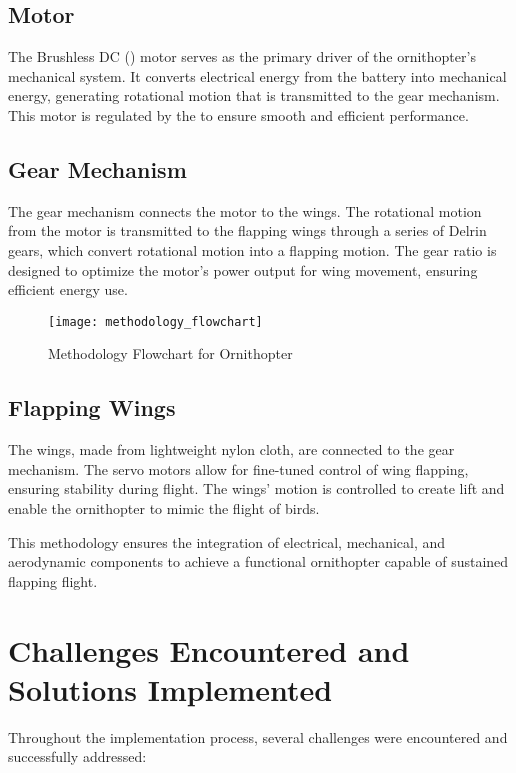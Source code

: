 \subsection{\bldc Motor}
The Brushless DC (\bldc) motor serves as the primary driver of the ornithopter's mechanical system. It converts electrical energy from the \lipo battery into mechanical energy, generating rotational motion that is transmitted to the gear mechanism. This motor is regulated by the \esc to ensure smooth and efficient performance.

\subsection{Gear Mechanism}
The gear mechanism connects the \bldc motor to the wings. The rotational motion from the motor is transmitted to the flapping wings through a series of Delrin gears, which convert rotational motion into a flapping motion. The gear ratio is designed to optimize the motor's power output for wing movement, ensuring efficient energy use.

\begin{figure}[H]
    \centering
    \texttt{[image: methodology\_flowchart]}
    \caption{Methodology Flowchart for Ornithopter}
    \label{fig:methodology_flowchart}
\end{figure}

\subsection{Flapping Wings}
The wings, made from lightweight nylon cloth, are connected to the gear mechanism. The servo motors allow for fine-tuned control of wing flapping, ensuring stability during flight. The wings' motion is controlled to create lift and enable the ornithopter to mimic the flight of birds.

This methodology ensures the integration of electrical, mechanical, and aerodynamic components to achieve a functional ornithopter capable of sustained flapping flight.

\section{Challenges Encountered and Solutions Implemented}
Throughout the implementation process, several challenges were encountered and successfully addressed:

